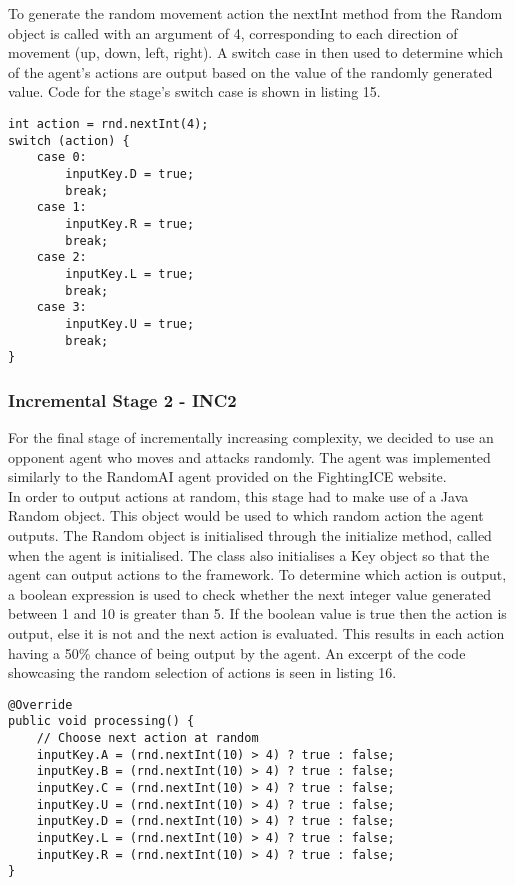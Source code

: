 \documentclass[12pt,a4paper]{article}
\begin{document}
To generate the random movement action the nextInt method from the Random object is called with an argument of 4, corresponding to each direction of movement (up, down, left, right). A switch case in then used to determine which of the agent's actions are output based on the value of the randomly generated value. Code for the stage's switch case is shown in listing 15.

\singlespacing
\begin{lstlisting}[caption=INC1 switch case.]
int action = rnd.nextInt(4);
switch (action) {
	case 0:
		inputKey.D = true;
		break;
	case 1:
		inputKey.R = true;
		break;
	case 2:
		inputKey.L = true;
		break;
	case 3:
		inputKey.U = true;
		break;
}
\end{lstlisting}
\newpage

\onehalfspace
\subsubsection*{Incremental Stage 2 - INC2}
For the final stage of incrementally increasing complexity, we decided to use an opponent agent who moves and attacks randomly. The agent was implemented similarly to the RandomAI agent provided on the FightingICE website.\\

In order to output actions at random, this stage had to make use of a Java Random object. This object would be used to which random action the agent outputs. The Random object is initialised through the initialize method, called when the agent is initialised. The class also initialises a Key object so that the agent can output actions to the framework. To determine which action is output, a boolean expression is used to check whether the next integer value generated between 1 and 10 is greater than 5. If the boolean value is true then the action is output, else it is not and the next action is evaluated. This results in each action having a 50\% chance of being output by the agent. An excerpt of the code showcasing the random selection of actions is seen in listing 16.\\

\singlespacing
\begin{lstlisting}[caption=INC2 random action selection.]
@Override
public void processing() {
	// Choose next action at random
	inputKey.A = (rnd.nextInt(10) > 4) ? true : false;
	inputKey.B = (rnd.nextInt(10) > 4) ? true : false;
	inputKey.C = (rnd.nextInt(10) > 4) ? true : false;
	inputKey.U = (rnd.nextInt(10) > 4) ? true : false;
	inputKey.D = (rnd.nextInt(10) > 4) ? true : false;
	inputKey.L = (rnd.nextInt(10) > 4) ? true : false;
	inputKey.R = (rnd.nextInt(10) > 4) ? true : false;
}	
\end{lstlisting}
\end{document}
